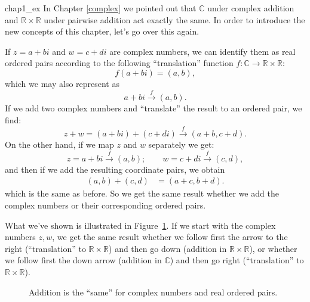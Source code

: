 \begin{example}{chap1_ex}
In Chapter \ref{complex} we pointed out that ${\mathbb C}$ under complex addition and ${\mathbb R} \times {\mathbb R}$ under pairwise addition act exactly the same. In order to introduce the new concepts of this chapter, let's go over this again. 

If $z = a+bi$ and $w = c+di$ are complex numbers, we can identify  them as real ordered pairs according to the following ``translation'' function $f:\mathbb{C} \rightarrow \mathbb{R} \times \mathbb{R}$:
\[f(a+bi) = (a,b),\]
which we may also represent as
\[ a+bi \xrightarrow{f} (a,b). \]
If we add two complex numbers and ``translate'' the result to an ordered pair, we find:
\[
z + w = (a + bi) + (c + di)  \xrightarrow{f} (a+b,c+d).
\]
On the other hand, if we map $z$ and $w$ separately we get:
\[
z = a + bi  \xrightarrow{f} (a,b);\qquad w = c+di  \xrightarrow{f} (c,d),
\]
and then if we add the resulting  coordinate pairs, we obtain
\begin{align*}
(a,b) +  (c,d) 
&= (a+c,b+d). 
\end{align*}
which is the same as before. So we get the same result whether we add the complex numbers or their corresponding ordered pairs.  

What we've shown  is illustrated in Figure~\ref{fig:groups:CommDiag}. If we start with the complex numbers $z,w$, we get the same result whether we follow first the arrow to the right (``translation'' to ${\mathbb R} \times {\mathbb R}$) and then go down (addition in ${\mathbb R} \times {\mathbb R}$), or whether we follow first the down arrow (addition in ${\mathbb C}$) and then go right (``translation'' to ${\mathbb R} \times {\mathbb R}$).

\begin{figure}[htb]
	  \caption{\label{fig:groups:CommDiag} Addition is the ``same'' for complex numbers and real ordered pairs. }
\end{figure}

\end{example}

